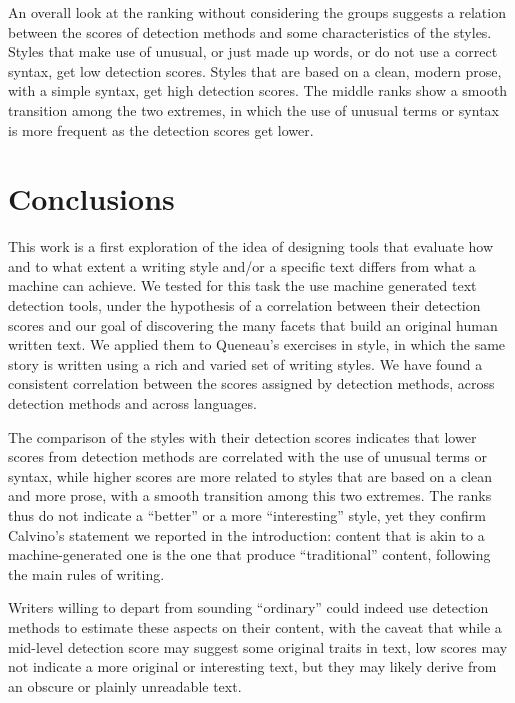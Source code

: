 \documentclass[
twocolumn,
]{ceurart}
\begin{document}
An overall look at the ranking without considering the groups suggests a relation between the scores of detection methods and some characteristics of the styles.
Styles that make use of unusual, or just made up words, or do not use a correct syntax, get low detection scores. 
Styles that are based on a clean, modern prose, with a simple syntax, get high detection scores. 
The middle ranks show a smooth transition among the two extremes, in which the use of unusual terms or syntax is more frequent as the detection scores get lower.


\section{Conclusions}

This work is a first exploration of the idea of designing tools that evaluate how and to what extent a writing style and/or a specific text differs from what a machine can achieve.
We tested for this task the use machine generated text detection tools, under the hypothesis of a correlation between their detection scores and our goal of discovering the many facets that build an original human written text.
We applied them to Queneau's exercises in style, in which the same story is written using a rich and varied set of writing styles.
We have found a consistent correlation between the scores assigned by detection methods, across detection methods and across languages.

The comparison of the styles with their detection scores indicates that lower scores from detection methods are correlated with the use of unusual terms or syntax, while higher scores are more related to styles that are based on a clean and more prose, with a smooth transition among this two extremes.
The ranks thus do not indicate a ``better'' or a more ``interesting'' style, yet they confirm Calvino's statement we reported in the introduction: content that is akin to a machine-generated one is the one that produce ``traditional'' content, following the main rules of writing.

Writers willing to depart from sounding ``ordinary'' could indeed use detection methods to estimate these aspects on their content, with the caveat that while a mid-level detection score may suggest some original traits in text, low scores may not indicate a more original or interesting text, but they may likely derive from an obscure or plainly unreadable text.
\end{document}
